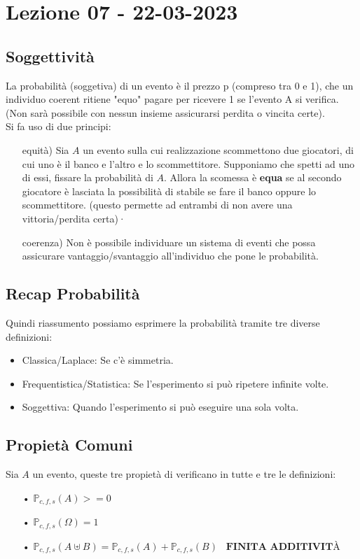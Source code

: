 \section{Lezione 07 - 22-03-2023}

\subsection{Soggettività}
La probabilità (soggetiva) di un evento è il prezzo p (compreso tra 0 e 1), che un individuo coerent ritiene "equo" pagare per ricevere 1 se l'evento A si verifica.\\
(Non sarà possibile con nessun insieme assicurarsi perdita o vincita certe).\\
Si fa uso di due principi:
\begin{itemize}
\item[equità)] Sia $A$ un evento sulla cui realizzazione scommettono due giocatori, di cui uno è il banco e l'altro e lo scommettitore. Supponiamo che spetti ad uno di essi, fissare la probabilità di $A$. Allora la scomessa è \textbf{equa} se al secondo giocatore è lasciata la possibilità di stabile se fare il banco oppure lo scommettitore.
(questo permette ad entrambi di non avere una vittoria/perdita certa)·
\item[coerenza)] Non è possibile individuare un sistema di
eventi che possa assicurare vantaggio/svantaggio all’individuo che pone
le probabilità.
\end{itemize}

\subsection{Recap Probabilità}
Quindi riassumento possiamo esprimere la probabilità tramite tre diverse definizioni:
\begin{itemize}
\item Classica/Laplace: Se c'è simmetria.
\item Frequentistica/Statistica: Se l'esperimento si può ripetere infinite volte.
\item Soggettiva: Quando l'esperimento si può eseguire una sola volta.
\end{itemize}

\subsection{Propietà Comuni}
Sia $A$ un evento, queste tre propietà di verificano in tutte e tre le definizioni:
\begin{itemize}
\item[•] $ \mathbb{P}_{c,f,s}(A) >= 0 $
\item[•] $ \mathbb{P}_{c,f,s}(\Omega) = 1 $
\item[•] $ \mathbb{P}_{c,f,s}(A \uplus B) = \mathbb{P}_{c,f,s}(A) + \mathbb{P}_{c,f,s}(B) \;\;\; \textbf{FINITA ADDITIVITÀ} $ 
\end{itemize}

